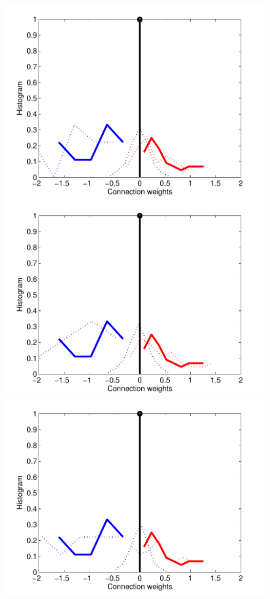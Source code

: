 \begin{figure}[h]
\begin{minipage}[c]{0.3\hsize}
\includegraphics[width=\hsize]{../figs/FigureA3_hist_iid}
\end{minipage}
\begin{minipage}[c]{0.3\hsize}
\includegraphics[width=\hsize]{../figs/FigureA3_hist_mcmc}
\end{minipage}
\begin{minipage}[c]{0.3\hsize}
\includegraphics[width=\hsize]{../figs/FigureA3_hist_orig}

\end{minipage}
\end{figure}
